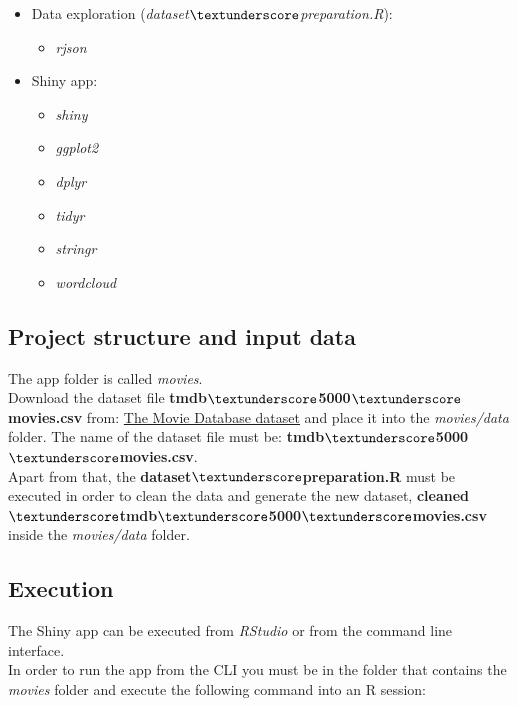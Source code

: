 \begin{itemize}
	\item Data exploration (\textit{dataset$\textunderscore$preparation.R}):
		\begin{itemize}
			\item \textit{rjson}
		\end{itemize}
	\item Shiny app:
		\begin{itemize}
			\item \textit{shiny}
			\item \textit{ggplot2}
			\item \textit{dplyr}
			\item \textit{tidyr}
			\item \textit{stringr}
			\item \textit{wordcloud}
		\end{itemize}
\end{itemize}

\subsection{Project structure and input data}

The app folder is called \textit{movies}.\\

Download the dataset file \textbf{tmdb$\textunderscore$5000$\textunderscore$movies.csv} from: \href{https://www.kaggle.com/tmdb/tmdb-movie-metadata?select=tmdb_5000_movies.csv}{The Movie Database dataset} and place it into the \textit{movies/data} folder. The name of the dataset file must be: \textbf{tmdb$\textunderscore$5000$\textunderscore$movies.csv}.\\

Apart from that, the \textbf{dataset$\textunderscore$preparation.R} must be executed in order to clean the data and generate the new dataset, \textbf{cleaned$\textunderscore$tmdb$\textunderscore$5000$\textunderscore$movies.csv} inside the \textit{movies/data} folder.\\

\subsection{Execution}

The Shiny app can be executed from \textit{RStudio} or from the command line interface. \\

In order to run the app from the CLI you must be in the folder that contains the \textit{movies} folder and execute the following command into an R session:

